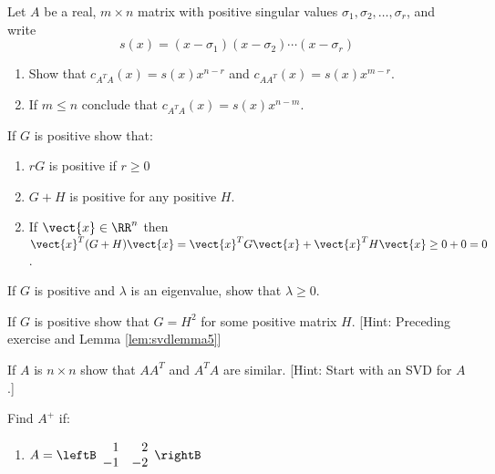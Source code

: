 \begin{multicols}{2}
\begin{ex}
Let $A$ be a real, $m\times n$ matrix with positive singular values $\sigma_{1},\sigma_{2},\dots ,\sigma_{r}$, and write 
\begin{equation*}
s(x)=(x-\sigma_{1})(x-\sigma_{2})\cdots (x-\sigma_{r})
\end{equation*}
\begin{enumerate}[label={\alph*.}]
\item Show that $c_{A^{T}A}(x)=s(x)x^{n-r}$ and \newline $c_{AA^{T}}(x)=s(x)x^{m-r}$.
\item If $m\leq n$ conclude that $c_{A^{T}A}(x)=s(x)x^{n-m}$.
\end{enumerate}
\end{ex}

\begin{ex}
If $G$ is positive show that: 
\begin{enumerate}[label={\alph*.}]
\item $rG$ is positive if $r\geq 0$
\item $G+H$ is positive for any positive $H$.
\end{enumerate}
\begin{sol}
\begin{enumerate}[label={\alph*.}]
\setcounter{enumi}{1}
\item If $\vect{x}\in \RR^{n}$ then $\vect{x}^{T}(G+H)\vect{x}=\vect{x}^{T}G\vect{x}+\vect{x}^{T}H\vect{x}\geq 0+0=0$.
\end{enumerate}
\end{sol}
\end{ex}

\begin{ex}
If $G$ is positive and $\lambda$ is an eigenvalue, show that $\lambda \geq 0$.
\end{ex}

\begin{ex}
If $G$ is positive show that $G=H^{2}$ for some positive matrix $H$. [Hint: Preceding exercise and Lemma \ref{lem:svdlemma5}] 
\end{ex}

\begin{ex}
If $A$ is $n\times n$ show that $AA^{T}$ and $A^{T}A$ are similar. [Hint: Start with an SVD for $A$.]
\end{ex} 

\begin{ex}
Find $A^{+}$ if: 
\begin{enumerate}[label={\alph*.}]
\item
 $A=
\leftB 
\begin{array}{rr}
1 & 2 \\ 
-1 & -2
\end{array}
\rightB$


\end{enumerate}
\end{ex}
\end{multicols}
